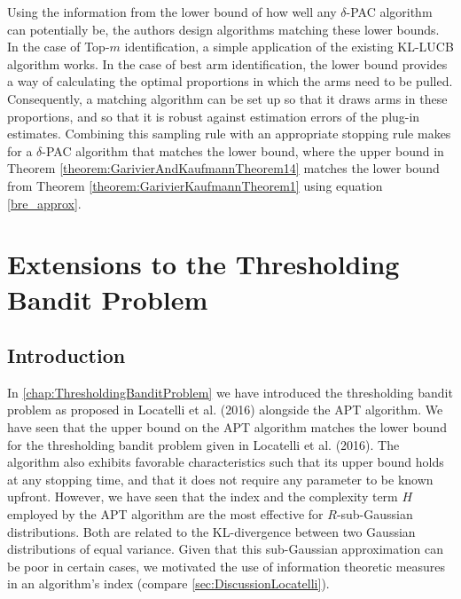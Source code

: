 \documentclass[12pt,]{article}
\begin{document}
Using the information from the lower bound of how well any
\(\delta\)-PAC algorithm can potentially be, the authors design
algorithms matching these lower bounds. In the case of Top-\(m\)
identification, a simple application of the existing KL-LUCB algorithm
works. In the case of best arm identification, the lower bound provides
a way of calculating the optimal proportions in which the arms need to
be pulled. Consequently, a matching algorithm can be set up so that it
draws arms in these proportions, and so that it is robust against
estimation errors of the plug-in estimates. Combining this sampling rule
with an appropriate stopping rule makes for a \(\delta\)-PAC algorithm
that matches the lower bound, where the upper bound in Theorem
\ref{theorem:GarivierAndKaufmannTheorem14} matches the lower bound from
Theorem \ref{theorem:GarivierKaufmannTheorem1} using equation
\eqref{bre_approx}.

\newpage

\section{\texorpdfstring{Extensions to the Thresholding Bandit Problem
\label{chap:Extensions}}{Extensions to the Thresholding Bandit Problem }}\label{extensions-to-the-thresholding-bandit-problem}

\subsection{\texorpdfstring{Introduction
\label{sec:ExtensionsIntroduction}}{Introduction }}\label{introduction-1}

In \autoref{chap:ThresholdingBanditProblem} we have introduced the
thresholding bandit problem as proposed in Locatelli et al. (2016)
alongside the APT algorithm. We have seen that the upper bound on the
APT algorithm matches the lower bound for the thresholding bandit
problem given in Locatelli et al. (2016). The algorithm also exhibits
favorable characteristics such that its upper bound holds at any
stopping time, and that it does not require any parameter to be known
upfront. However, we have seen that the index and the complexity term
\(H\) employed by the APT algorithm are the most effective for
\(R\)-sub-Gaussian distributions. Both are related to the KL-divergence
between two Gaussian distributions of equal variance. Given that this
sub-Gaussian approximation can be poor in certain cases, we motivated
the use of information theoretic measures in an algorithm's index
(compare \autoref{sec:DiscussionLocatelli}).
\end{document}

